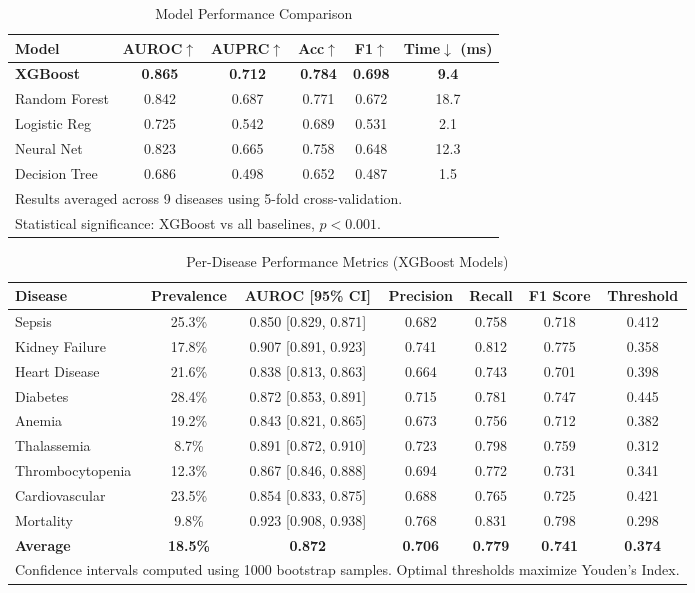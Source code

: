 \documentclass[conference]{IEEEtran}
\begin{document}
\begin{table}[!t]
\caption{Model Performance Comparison}
\label{tab:model_comparison}
\centering
\footnotesize
\begin{tabular}{lccccc}
\toprule
\textbf{Model} & \textbf{AUROC}$\uparrow$ & \textbf{AUPRC}$\uparrow$ & \textbf{Acc}$\uparrow$ & \textbf{F1}$\uparrow$ & \textbf{Time}$\downarrow$ (ms) \\
\midrule
\textbf{XGBoost} & \textbf{0.865} & \textbf{0.712} & \textbf{0.784} & \textbf{0.698} & \textbf{9.4} \\
Random Forest & 0.842 & 0.687 & 0.771 & 0.672 & 18.7 \\
Logistic Reg & 0.725 & 0.542 & 0.689 & 0.531 & 2.1 \\
Neural Net & 0.823 & 0.665 & 0.758 & 0.648 & 12.3 \\
Decision Tree & 0.686 & 0.498 & 0.652 & 0.487 & 1.5 \\
\bottomrule
\multicolumn{6}{l}{\scriptsize Results averaged across 9 diseases using 5-fold cross-validation.}\\
\multicolumn{6}{l}{\scriptsize Statistical significance: XGBoost vs all baselines, $p < 0.001$.}
\end{tabular}
\end{table}

\begin{table}[!t]
\caption{Per-Disease Performance Metrics (XGBoost Models)}
\label{tab:per_disease}
\centering
\footnotesize
\begin{tabular}{lcccccc}
\toprule
\textbf{Disease} & \textbf{Prevalence} & \textbf{AUROC [95\% CI]} & \textbf{Precision} & \textbf{Recall} & \textbf{F1 Score} & \textbf{Threshold} \\
\midrule
Sepsis & 25.3\% & 0.850 [0.829, 0.871] & 0.682 & 0.758 & 0.718 & 0.412 \\
Kidney Failure & 17.8\% & 0.907 [0.891, 0.923] & 0.741 & 0.812 & 0.775 & 0.358 \\
Heart Disease & 21.6\% & 0.838 [0.813, 0.863] & 0.664 & 0.743 & 0.701 & 0.398 \\
Diabetes & 28.4\% & 0.872 [0.853, 0.891] & 0.715 & 0.781 & 0.747 & 0.445 \\
Anemia & 19.2\% & 0.843 [0.821, 0.865] & 0.673 & 0.756 & 0.712 & 0.382 \\
Thalassemia & 8.7\% & 0.891 [0.872, 0.910] & 0.723 & 0.798 & 0.759 & 0.312 \\
Thrombocytopenia & 12.3\% & 0.867 [0.846, 0.888] & 0.694 & 0.772 & 0.731 & 0.341 \\
Cardiovascular & 23.5\% & 0.854 [0.833, 0.875] & 0.688 & 0.765 & 0.725 & 0.421 \\
Mortality & 9.8\% & 0.923 [0.908, 0.938] & 0.768 & 0.831 & 0.798 & 0.298 \\
\midrule
\textbf{Average} & \textbf{18.5\%} & \textbf{0.872} & \textbf{0.706} & \textbf{0.779} & \textbf{0.741} & \textbf{0.374} \\
\bottomrule
\multicolumn{7}{l}{\scriptsize Confidence intervals computed using 1000 bootstrap samples. Optimal thresholds maximize Youden's Index.}
\end{tabular}
\end{table}
\end{document}
